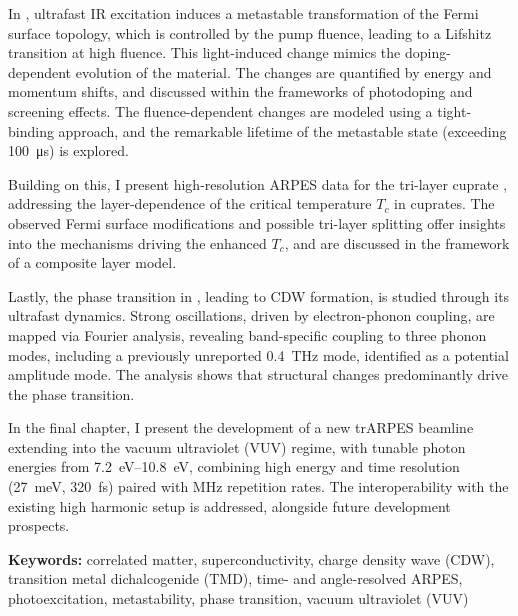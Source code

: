 In , ultrafast IR excitation induces a metastable transformation of the Fermi surface topology, which is controlled by the pump fluence, leading to a Lifshitz transition at high fluence.
This light-induced change mimics the doping-dependent evolution of the material.
The changes are quantified by energy and momentum shifts, and discussed within the frameworks of photodoping and screening effects.
The fluence-dependent changes are modeled using a tight-binding approach, and the remarkable lifetime of the metastable state (exceeding \qty{100}{\micro\second}) is explored.

Building on this, I present high-resolution ARPES data for the tri-layer cuprate , addressing the layer-dependence of the critical temperature $T_c$ in cuprates.
The observed Fermi surface modifications and possible tri-layer splitting offer insights into the mechanisms driving the enhanced $T_c$, and are discussed in the framework of a composite layer model.

Lastly, the phase transition in , leading to CDW formation, is studied through its ultrafast dynamics.
Strong oscillations, driven by electron-phonon coupling, are mapped via Fourier analysis, revealing band-specific coupling to three phonon modes, including a previously unreported \qty{0.4}{\tera\hertz} mode, identified as a potential amplitude mode.
The analysis shows that structural changes predominantly drive the phase transition.

In the final chapter, I present the development of a new trARPES beamline extending into the vacuum ultraviolet (VUV) regime, with tunable photon energies from \qtyrange{7.2}{10.8}{\electronvolt}, combining high energy and time resolution (\qty{27}{\milli\electronvolt}, \qty{320}{\femto\second}) paired with \unit{\mega\hertz} repetition rates.
The interoperability with the existing high harmonic setup is addressed, alongside future development prospects.\hfill\break

\textbf{Keywords:} correlated matter, superconductivity, charge density wave (CDW), transition metal dichalcogenide (TMD), time- and angle-resolved ARPES, photoexcitation, metastability, phase transition, vacuum ultraviolet (VUV)


